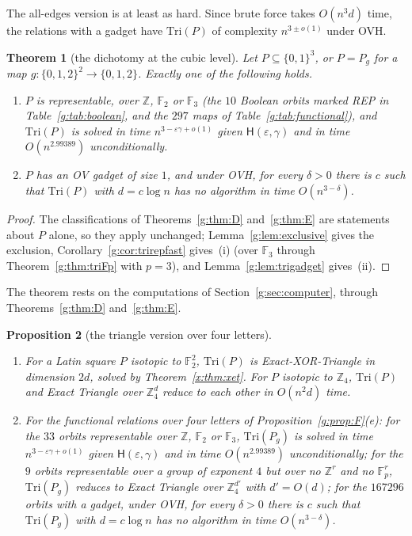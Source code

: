 \documentclass[11pt]{article}
\newtheorem{theorem}{Theorem}[section]
\newtheorem{proposition}[theorem]{Proposition}
\theoremstyle{definition}
\theoremstyle{remark}
\newcommand{\Z}{\mathbb{Z}}
\newcommand{\F}{\mathbb{F}_2}
\newcommand{\Fp}{\mathbb{F}_p}
\newcommand{\eps}{\varepsilon}
\newcommand{\Hyp}{\mathsf{H}}
\newcommand{\ExpTriBestUp}{2.99389}%
\begin{document}
The all-edges version is at least as hard. Since brute force takes $O(n^3d)$ time, the relations with a gadget have $\mathrm{Tri}(P)$ of complexity $n^{3\pm o(1)}$ under OVH.

\begin{theorem}[the dichotomy at the cubic level]\label{g:thm:triD}
Let $P\subseteq\{0,1\}^3$, or $P=P_g$ for a map $g\colon\{0,1,2\}^2\to\{0,1,2\}$. Exactly one of the following holds.
\begin{enumerate}[label=\textup{(\roman*)}]
\item $P$ is representable, over $\Z$, $\F$ or $\mathbb F_3$ (the $10$ Boolean orbits marked REP in Table~\ref{g:tab:boolean}, and the $297$ maps of Table~\ref{g:tab:functional}), and $\mathrm{Tri}(P)$ is solved in time $n^{3-\eps\gamma+o(1)}$ given $\Hyp(\eps,\gamma)$ and in time $O(n^{\ExpTriBestUp})$ unconditionally.
\item $P$ has an OV gadget of size $1$, and under OVH, for every $\delta>0$ there is $c$ such that $\mathrm{Tri}(P)$ with $d=c\log n$ has no algorithm in time $O(n^{3-\delta})$.
\end{enumerate}
\end{theorem}

\begin{proof}
The classifications of Theorems~\ref{g:thm:D} and~\ref{g:thm:E} are statements about $P$ alone, so they apply unchanged; Lemma~\ref{g:lem:exclusive} gives the exclusion, Corollary~\ref{g:cor:trirepfast} gives~(i) (over $\mathbb F_3$ through Theorem~\ref{g:thm:triFp} with $p=3$), and Lemma~\ref{g:lem:trigadget} gives~(ii).
\end{proof}

The theorem rests on the computations of Section~\ref{g:sec:computer}, through Theorems~\ref{g:thm:D} and~\ref{g:thm:E}.

\begin{proposition}[the triangle version over four letters]\label{g:prop:triF}
\begin{enumerate}[label=\textup{(\alph*)}]
\item For a Latin square $P$ isotopic to $\F^2$, $\mathrm{Tri}(P)$ is Exact-XOR-Triangle in dimension $2d$, solved by Theorem~\ref{x:thm:xet}. For $P$ isotopic to $\Z_4$, $\mathrm{Tri}(P)$ and Exact Triangle over $\Z_4^d$ reduce to each other in $O(n^2d)$ time.
\item For the functional relations over four letters of Proposition~\ref{g:prop:F}(e): for the $33$ orbits representable over $\Z$, $\F$ or $\mathbb F_3$, $\mathrm{Tri}(P_g)$ is solved in time $n^{3-\eps\gamma+o(1)}$ given $\Hyp(\eps,\gamma)$ and in time $O(n^{\ExpTriBestUp})$ unconditionally; for the $9$ orbits representable over a group of exponent $4$ but over no $\Z^r$ and no $\Fp^r$, $\mathrm{Tri}(P_g)$ reduces to Exact Triangle over $\Z_4^{d'}$ with $d'=O(d)$; for the $167296$ orbits with a gadget, under OVH, for every $\delta>0$ there is $c$ such that $\mathrm{Tri}(P_g)$ with $d=c\log n$ has no algorithm in time $O(n^{3-\delta})$.
\end{enumerate}
\end{proposition}
\end{document}
